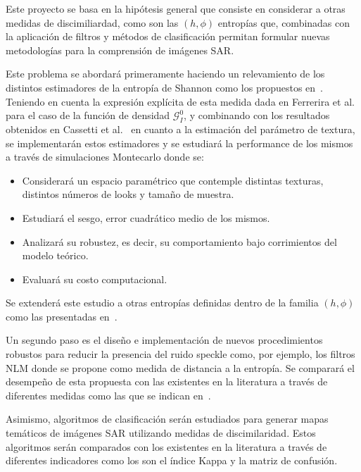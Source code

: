 \documentclass[11pt]{article}
\begin{document}
Este proyecto se basa en la hipótesis general que consiste en considerar a otras medidas de discimiliardad, como son las $(h,\phi)$ entropías que, combinadas con la aplicación de filtros y métodos de clasificación permitan formular nuevas metodologías para la comprensión de imágenes SAR.

Este problema se abordará primeramente haciendo un relevamiento de los distintos estimadores de la entropía de Shannon como los propuestos en~\cite{Beirlant1997,AlOmari2013,Behmardi2011}. Teniendo en cuenta la expresión explícita de esta medida dada en Ferrerira et al.~\cite{Ferreira2020} para el caso de la función de densidad $\mathcal{G}_I^0$, y combinando con los resultados obtenidos en Cassetti et al.~\cite{Cassetti2020} en cuanto a la estimación del parámetro de textura, se implementarán estos estimadores y se estudiará la performance de los mismos a través de simulaciones Montecarlo donde se:
\begin{itemize}
	\item Considerará un espacio paramétrico que contemple distintas texturas, distintos números de looks y tamaño de muestra.
	\item Estudiará el sesgo, error cuadrático medio de los mismos.
	\item Analizará su robustez, es decir, su comportamiento bajo corrimientos del modelo teórico. 
	\item Evaluará su costo computacional.
\end{itemize} 

Se extenderá este estudio a otras entropías definidas dentro de la familia $(h,\phi)$ como las presentadas en~\cite{Frery2019}.

Un segundo paso es el diseño e implementación de nuevos procedimientos robustos para reducir la presencia del ruido speckle como, por ejemplo, los filtros NLM donde se propone como medida de distancia a la entropía. Se comparará el desempeño de esta propuesta con las existentes en la literatura a través de diferentes medidas como las que se indican en~\cite{Frery2019}.

Asimismo, algoritmos de clasificación serán estudiados para generar mapas temáticos de imágenes SAR utilizando medidas de discimilaridad. Estos algoritmos serán comparados con los existentes en la literatura a través de diferentes indicadores como los son el índice Kappa y la matriz de confusión.

%


\end{document}
